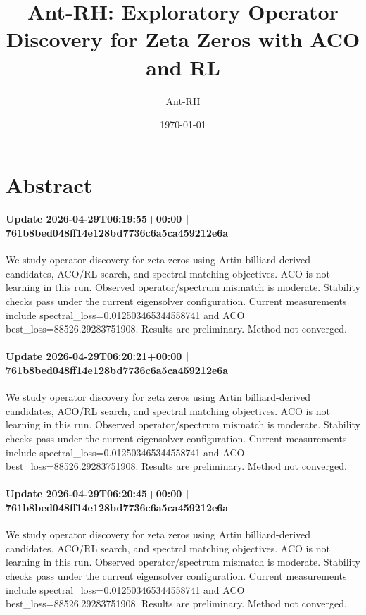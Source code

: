 \documentclass{article}
\begin{document}
\title{Ant-RH: Exploratory Operator Discovery for Zeta Zeros with ACO and RL}
\author{Ant-RH}
\date{\today}
\maketitle

\section*{Abstract}
\paragraph{Update 2026-04-29T06:19:55+00:00 | 761b8bed048ff14e128bd7736c6a5ca459212e6a}

We study operator discovery for zeta zeros using Artin billiard-derived candidates, ACO/RL search, and spectral matching objectives. ACO is not learning in this run. Observed operator/spectrum mismatch is moderate. Stability checks pass under the current eigensolver configuration. Current measurements include spectral\_loss=0.012503465344558741 and ACO best\_loss=88526.29283751908. Results are preliminary. Method not converged.

\paragraph{Update 2026-04-29T06:20:21+00:00 | 761b8bed048ff14e128bd7736c6a5ca459212e6a}

We study operator discovery for zeta zeros using Artin billiard-derived candidates, ACO/RL search, and spectral matching objectives. ACO is not learning in this run. Observed operator/spectrum mismatch is moderate. Stability checks pass under the current eigensolver configuration. Current measurements include spectral\_loss=0.012503465344558741 and ACO best\_loss=88526.29283751908. Results are preliminary. Method not converged.

\paragraph{Update 2026-04-29T06:20:45+00:00 | 761b8bed048ff14e128bd7736c6a5ca459212e6a}

We study operator discovery for zeta zeros using Artin billiard-derived candidates, ACO/RL search, and spectral matching objectives. ACO is not learning in this run. Observed operator/spectrum mismatch is moderate. Stability checks pass under the current eigensolver configuration. Current measurements include spectral\_loss=0.012503465344558741 and ACO best\_loss=88526.29283751908. Results are preliminary. Method not converged.
\end{document}
